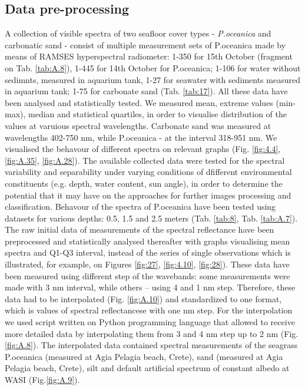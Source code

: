 \documentclass[10pt, a4paper]{article}
\begin{document}
\subsection{Data pre-processing}
A collection of visible spectra of two seafloor cover types - \textit{P.oceanica} and carbonatic sand - consist of multiple measurement sets of P.oceanica made by means of RAMSES hyperspectral radiometer: 1-350 for 15th October (fragment on Tab. \ref{tab:A.8}), 1-445 for 14th October for P.oceanica; 1-106 for water without sedimnts, measured in aquarium tank, 1-27 for seawater with sediments measured in aquarium tank; 1-75 for carbonate sand (Tab. \ref{tab:17}). All these data have been analysed and statistically tested. We measured mean, extreme values (min-max), median and statistical quartiles, in order to visualise distribution of the values at varuious spectral wavelengths. Carbonate sand was measured at wavelengths 402-750 nm, while P.oceanica - at the interval 318-951 nm. We visualised the behavour of different spectra on relevant graphs (Fig. \ref{fig:4.4}, \ref{fig:A.35}, \ref{fig:A.28}). 
The available collected data were tested for the spectral variability and separability under varying conditions of dfifferent environmental
constituents (e.g. depth, water content, sun angle), in order to determine the
potential that it may have on the approaches for further images processing and classification. Behavour of the spectra of P.oceanica have been tested using datasets for various depths: 0.5, 1.5 and 2.5 meters (Tab. \ref{tab:8}, Tab. \ref{tab:A.7}). The raw
initial data of measurements of the spectral reflectance have been preprocessed and statistically analysed thereafter with graphs visualising mean spectra and Q1-Q3 interval, instead of the series of single observations which is illustrated, for example, on Figures \ref{fig:27}, \ref{fig:4.10}, \ref{fig:28}). These data
have been measured using different step of the wavebands: some measurements
were made with 3 nm interval, while others – using 4 and 1 nm step.
Therefore, these data had to be interpolated (Fig. \ref{fig:A.10}) and standardized to one
format, which is values of spectral reflectancese with one nm step. For the
interpolation we used script written on Python programming language that allowed to receive more 
detailed data by interpolating them from 3 and 4 nm step up to 2 nm (Fig.\ref{fig:A.8}).
The interpolated data contained spectral measurements of the seagrass P.oceanica (measured at Agia
Pelagia beach, Crete), sand (measured at Agia Pelagia beach, Crete), silt and default artificial
spectrum of constant albedo at WASI (Fig.\ref{fig:A.9}). 
\end{document}
